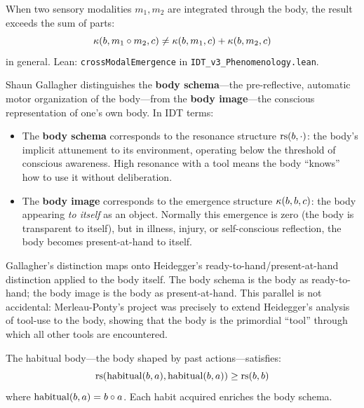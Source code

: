 \begin{theorem}
\label{thm:cross-modal}
When two sensory modalities $m_1, m_2$ are integrated through the body,
the result exceeds the sum of parts:
\[
\kappa(b, m_1 \circ m_2, c) \neq \kappa(b, m_1, c) + \kappa(b, m_2, c)
\]
in general.  Lean: \texttt{crossModalEmergence} in \texttt{IDT\_v3\_Phenomenology.lean}.
\end{theorem}

\begin{interpretation}
\label{interp:gallagher-body}
Shaun Gallagher distinguishes the \textbf{body schema}---the pre-reflective,
automatic motor organization of the body---from the \textbf{body image}---the
conscious representation of one's own body.  In IDT terms:

\begin{itemize}
\item The \textbf{body schema} corresponds to the resonance structure
$\mathrm{rs}(b, \cdot)$: the body's implicit attunement to its environment, operating
below the threshold of conscious awareness.  High resonance with a tool means
the body ``knows'' how to use it without deliberation.

\item The \textbf{body image} corresponds to the emergence structure
$\kappa(b, b, c)$: the body appearing \emph{to itself} as an object.
Normally this emergence is zero (the body is transparent to itself), but in
illness, injury, or self-conscious reflection, the body becomes
present-at-hand to itself.
\end{itemize}

Gallagher's distinction maps onto Heidegger's ready-to-hand/present-at-hand
distinction applied to the body itself.  The body schema is the body as
ready-to-hand; the body image is the body as present-at-hand.  This parallel
is not accidental: Merleau-Ponty's project was precisely to extend Heidegger's
analysis of tool-use to the body, showing that the body is the primordial
``tool'' through which all other tools are encountered.
\end{interpretation}

\begin{theorem}
\label{thm:habitual-enrichment}
The habitual body---the body shaped by past actions---satisfies:
\[
\mathrm{rs}(\mathrm{habitual}(b, a), \mathrm{habitual}(b, a)) \geq \mathrm{rs}(b, b)
\]
where $\mathrm{habitual}(b, a) = b \circ a$.  Each habit acquired enriches
the body schema.
\end{theorem}

